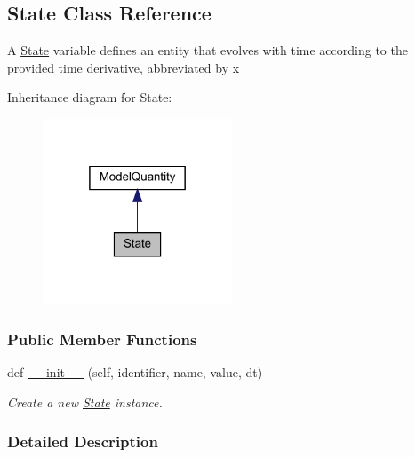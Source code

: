 \hypertarget{classamici_1_1ode__export_1_1_state}{}\subsection{State Class Reference}
\label{classamici_1_1ode__export_1_1_state}


A \mbox{\hyperlink{classamici_1_1ode__export_1_1_state}{State}} variable defines an entity that evolves with time according to the provided time derivative, abbreviated by {\ttfamily x}  




Inheritance diagram for State\+:
\nopagebreak
\begin{figure}[H]
\begin{center}
\leavevmode
\includegraphics[width=160pt]{classamici_1_1ode__export_1_1_state__inherit__graph}
\end{center}
\end{figure}
\subsubsection*{Public Member Functions}
\begin{DoxyCompactItemize}
\item 
def \mbox{\hyperlink{classamici_1_1ode__export_1_1_state_a6d1dffcaf03a86ff057810e5eed3b464}{\+\_\+\+\_\+init\+\_\+\+\_\+}} (self, identifier, name, value, dt)
\begin{DoxyCompactList}\small\item\em Create a new \mbox{\hyperlink{classamici_1_1ode__export_1_1_state}{State}} instance. \end{DoxyCompactList}\end{DoxyCompactItemize}


\subsubsection{Detailed Description}



